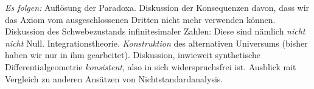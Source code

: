\documentclass{zirkelblatt}
\theoremstyle{definition}
\theoremstyle{plain}
\theoremstyle{remark}
\begin{document}
\vfill

\emph{Es folgen:} Auflösung der Paradoxa. Diskussion der Konsequenzen davon,
dass wir das Axiom vom ausgeschlossenen Dritten nicht mehr verwenden können.
Diskussion des Schwebezustands infinitesimaler Zahlen: Diese sind nämlich
\emph{nicht nicht} Null. Integrationstheorie. \emph{Konstruktion} des
alternativen Universums (bisher haben wir nur in ihm gearbeitet). Diskussion,
inwieweit synthetische Differentialgeometrie \emph{konsistent}, also in
sich widerspruchsfrei ist. Ausblick mit Vergleich zu anderen Ansätzen von
Nichtstandardanalysis.
\end{document}
